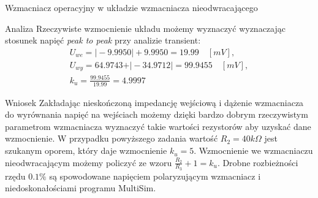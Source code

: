 \documentclass[a4paper]{scrartcl}
\begin{document}
\begin{section}{Wzmacniacz operacyjny w układzie wzmacniacza nieodwracającego}
\begin{subsection}{Analiza}
				Rzeczywiste wzmocnienie układu możemy wyznaczyć wyznaczając stosunek napięć \textit{peak to peak} przy analizie transient:
				\begin{gather*}
					U_{we} = \vert-9.9950\vert + 9.9950 = 19.99\quad [mV], \\ 
					U_{wy} = 64.9743 + \vert-34.9712\vert = 99.9455 \quad [mV],\\
					k_{u} = \frac{99.9455}{19.99} = 4.9997 
				\end{gather*}
		\end{subsection}
		\begin{subsection}{Wniosek}
			Zakładając nieskończoną impedancję wejściową i dążenie wzmacniacza do wyrównania napięć na wejściach możemy dzięki bardzo dobrym rzeczywistym parametrom wzmacniacza wyznaczyć takie wartości rezystorów aby uzyskać dane wzmocnienie. W przypadku powyższego zadania wartość $ R_{2} = 40k\Omega $ jest szukanym oporem, który daje wzmocnienie $ k_{u} = 5 $. Wzmocnienie we wzmacniaczu nieodwracającym możemy policzyć ze wzoru $\frac{R_{2}}{R_{3}} + 1 = k_{u} $. Drobne rozbieżności rzędu $0.1 \% $ są spowodowane napięciem polaryzującym wzmacniacz i niedoskonałościami programu MultiSim.
		\end{subsection}
	\end{section}
\end{document}
